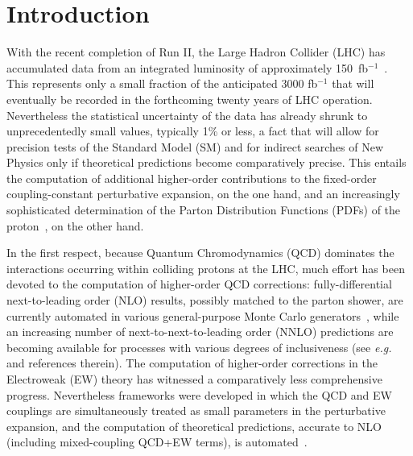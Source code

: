 \section{Introduction}
\label{sec:introduction}

With the recent completion of Run II, the Large Hadron Collider (LHC) has 
accumulated data from an integrated luminosity of approximately 
150~fb$^{-1}$~\cite{Mangano:2020icy}. This represents only a small fraction of 
the anticipated 3000 fb$^{-1}$ that will eventually be recorded in the 
forthcoming twenty years of LHC operation. Nevertheless the statistical 
uncertainty of the data has already shrunk to unprecedentedly small values,
typically 1\% or less, a fact that will allow for precision tests of the 
Standard Model (SM) and for indirect searches of New Physics only if 
theoretical predictions become comparatively precise. This entails the 
computation of additional higher-order contributions to the fixed-order 
coupling-constant perturbative expansion, on the one hand, and an increasingly 
sophisticated determination of the Parton Distribution Functions (PDFs) of the 
proton~\cite{Gao:2017yyd}, on the other hand. 

In the first respect, because Quantum Chromodynamics (QCD) dominates the 
interactions occurring within colliding protons at the LHC, much effort 
has been devoted to the computation of higher-order QCD corrections: 
fully-differential next-to-leading order (NLO) results, possibly matched to the
parton shower, are currently automated in various general-purpose
Monte Carlo generators~\cite{Gleisberg:2008ta,Alwall:2014hca,Bellm:2015jjp}, 
while an increasing number of next-to-next-to-leading order (NNLO) predictions 
are becoming available for processes with various degrees of inclusiveness
(see {\it e.g.}~\cite{Amoroso:2020lgh} and references therein). The computation
of higher-order corrections in the Electroweak (EW) theory has 
witnessed a comparatively less comprehensive progress. Nevertheless frameworks 
were developed in which the QCD and EW couplings are simultaneously treated as 
small parameters in the perturbative expansion, and the computation of 
theoretical predictions, accurate to NLO (including mixed-coupling QCD+EW 
terms), is automated~\cite{Biedermann:2017yoi,Frederix:2018nkq}.

